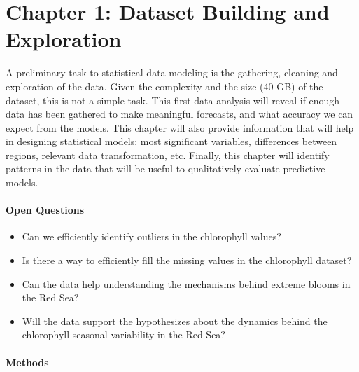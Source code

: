 \section{Chapter 1: Dataset Building and Exploration}

A preliminary task to statistical data modeling is the gathering, cleaning and
exploration of the data. Given the complexity and the size (40 GB) of the
dataset, this is not a simple task. This first data analysis will reveal if
enough data has been gathered to make meaningful forecasts, and what accuracy
we can expect from the models. This chapter will also provide information that
will help in designing statistical models: most significant variables,
differences between regions, relevant data transformation, etc. Finally, this
chapter will identify patterns in the data that will be useful to qualitatively
evaluate predictive models.

\paragraph{Open Questions}

\begin{itemize} 

\item Can we efficiently identify outliers in the chlorophyll values?

\item Is there a way to efficiently fill the missing values in the chlorophyll
dataset?

\item Can the data help understanding the mechanisms behind extreme blooms in
the Red Sea?

\item Will the data support the hypothesizes about the dynamics behind the
chlorophyll seasonal variability in the Red Sea?

\end{itemize}

\paragraph{Methods}

